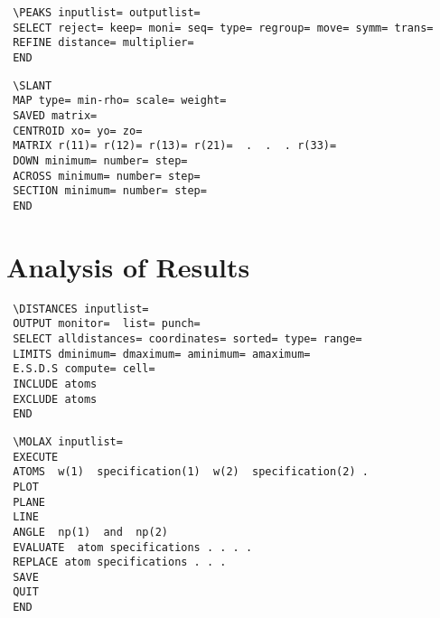 \documentclass[10pt,a4paper]{report}
\begin{document}
\bigskip{}



\small\begin{verbatim}
 \PEAKS inputlist= outputlist=
 SELECT reject= keep= moni= seq= type= regroup= move= symm= trans=
 REFINE distance= multiplier=
 END
\end{verbatim}\normalsize




\bigskip{}



\small\begin{verbatim}
 \SLANT
 MAP type= min-rho= scale= weight=
 SAVED matrix=
 CENTROID xo= yo= zo=
 MATRIX r(11)= r(12)= r(13)= r(21)=  .  .  . r(33)=
 DOWN minimum= number= step=
 ACROSS minimum= number= step=
 SECTION minimum= number= step=
 END
\end{verbatim}\normalsize


\section{Analysis of Results}


\bigskip{}



\small\begin{verbatim}
 \DISTANCES inputlist=
 OUTPUT monitor=  list= punch=
 SELECT alldistances= coordinates= sorted= type= range=
 LIMITS dminimum= dmaximum= aminimum= amaximum=
 E.S.D.S compute= cell=
 INCLUDE atoms
 EXCLUDE atoms
 END
\end{verbatim}\normalsize




\bigskip{}



\small\begin{verbatim}
 \MOLAX inputlist=
 EXECUTE
 ATOMS  w(1)  specification(1)  w(2)  specification(2) .
 PLOT
 PLANE
 LINE
 ANGLE  np(1)  and  np(2)
 EVALUATE  atom specifications . . . .
 REPLACE atom specifications . . .
 SAVE
 QUIT
 END
\end{verbatim}\normalsize




\bigskip{}
\end{document}
